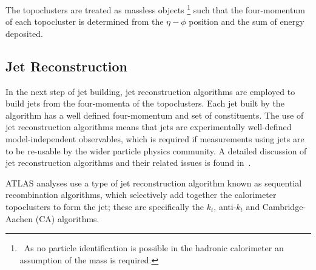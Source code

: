 The topoclusters are treated as massless objects \footnote{\ As no particle identification is possible in the hadronic calorimeter an assumption of the mass is required.}
such that the four-momentum of each topocluster is determined from the $\eta-\phi$ position and the sum of energy deposited.

\subsection{Jet Reconstruction}
\label{sec:obj-jets_reco}

In the next step of jet building, jet reconstruction algorithms are employed to build jets from
the four-momenta of the topoclusters.
Each jet built by the algorithm has a well defined four-momentum and set of constituents.
The use of jet reconstruction algorithms means that jets are experimentally well-defined model-independent observables,
which is required if measurements using jets are to be re-usable by the wider particle physics community.
A detailed discussion of jet reconstruction algorithms
and their related issues is found in~\cite{obj-jets_reco_salam}.

ATLAS analyses use a type of jet reconstruction algorithm known as sequential recombination algorithms,
which selectively add together the calorimeter topoclusters to form the jet;
these are specifically the $k_t$, anti-$k_t$ and Cambridge-Aachen (CA) algorithms.

